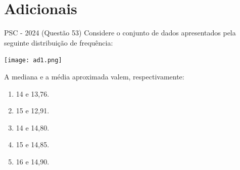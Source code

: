 \documentclass[aspectratio=169]{beamer}
\newif\ifusarcorvermelha
\newcommand{\vermelho}[1]{%
    \ifusarcorvermelha
        {\color{red}#1}%
    \else
        #1%
    \fi
}
\begin{document}
    \section{Adicionais}

        \begin{frame}{ PSC  - 2024 (Questão 53)}
        Considere o conjunto de dados apresentados pela seguinte distribuição de frequência:

        \begin{center}
            \texttt{[image: ad1.png]}
        \end{center} A mediana e a média aproximada valem, respectivamente:
        \begin{enumerate}[a]
            \item 14 e 13,76.
            \item \vermelho{15 e 12,91.}
            \item 14 e 14,80.
            \item 15 e 14,85.
            \item 16 e 14,90.

        \end{enumerate}        
    \end{frame}
\end{document}
